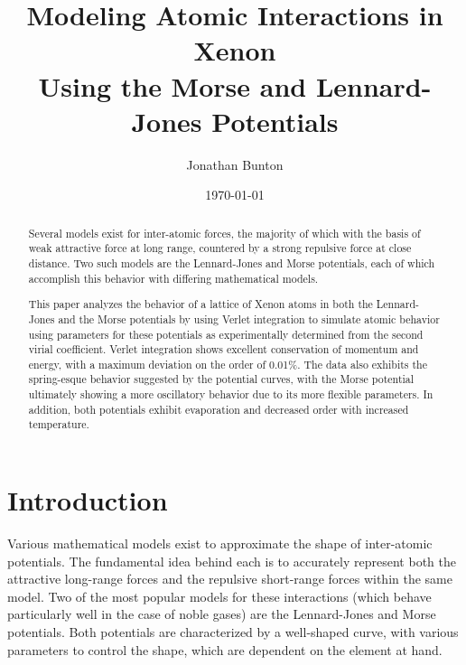 \documentclass[12pt]{article}
\author{Jonathan Bunton}
\title{Modeling Atomic Interactions in Xenon \\ Using the Morse and Lennard-Jones Potentials}
\date{\today}
\begin{document}
\maketitle
\onehalfspacing
\begin{abstract}
Several models exist for inter-atomic forces, the majority of which with the basis of weak attractive force at long range, countered by a strong repulsive force at close distance.    Two such models are the Lennard-Jones and Morse potentials, each of which accomplish this behavior with differing mathematical models.  

This paper analyzes the behavior of a lattice of Xenon atoms in both the Lennard-Jones and the Morse potentials by using Verlet integration to simulate atomic behavior using parameters for these potentials as experimentally determined from the second virial coefficient. \cite{mconstants, ljconstants}  Verlet integration shows excellent conservation of momentum and energy, with a maximum deviation on the order of 0.01\%.\cite{verlet}  The data also exhibits the spring-esque behavior suggested by the potential curves, with the Morse potential ultimately showing a more oscillatory behavior due to its more flexible parameters.  In addition, both potentials exhibit evaporation and decreased order with increased temperature.
\end{abstract}

\section*{Introduction}
Various mathematical models exist to approximate the shape of inter-atomic potentials.  The fundamental idea behind each is to accurately represent both the attractive long-range forces and the repulsive short-range forces within the same model.  Two of the most popular models for these interactions (which behave particularly well in the case of noble gases) are the Lennard-Jones and Morse potentials.  Both potentials are characterized by a well-shaped curve, with various parameters to control the shape, which are dependent on the element at hand.
\end{document}
